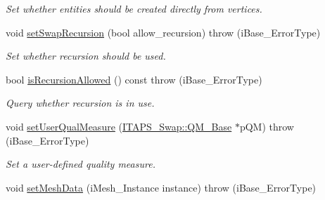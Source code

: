 \begin{DoxyCompactItemize}
\begin{DoxyCompactList}\small\item\em Set whether entities should be created directly from vertices. \item\end{DoxyCompactList}\item 
\hypertarget{class_i_t_a_p_s___swap_1_1_swap_a722719a31d50850b411b4e86f3b7fdfb}{
void \hyperlink{class_i_t_a_p_s___swap_1_1_swap_a722719a31d50850b411b4e86f3b7fdfb}{setSwapRecursion} (bool allow\_\-recursion)  throw (iBase\_\-ErrorType)}
\label{class_i_t_a_p_s___swap_1_1_swap_a722719a31d50850b411b4e86f3b7fdfb}

\begin{DoxyCompactList}\small\item\em Set whether recursion should be used. \item\end{DoxyCompactList}\item 
\hypertarget{class_i_t_a_p_s___swap_1_1_swap_a69252481d8dabc89dab04f3c746a729a}{
bool \hyperlink{class_i_t_a_p_s___swap_1_1_swap_a69252481d8dabc89dab04f3c746a729a}{isRecursionAllowed} () const   throw (iBase\_\-ErrorType)}
\label{class_i_t_a_p_s___swap_1_1_swap_a69252481d8dabc89dab04f3c746a729a}

\begin{DoxyCompactList}\small\item\em Query whether recursion is in use. \item\end{DoxyCompactList}\item 
\hypertarget{class_i_t_a_p_s___swap_1_1_swap_a6b19a2b25ce68389290223e5f732d077}{
void \hyperlink{class_i_t_a_p_s___swap_1_1_swap_a6b19a2b25ce68389290223e5f732d077}{setUserQualMeasure} (\hyperlink{class_i_t_a_p_s___swap_1_1_q_m___base}{ITAPS\_\-Swap::QM\_\-Base} $\ast$pQM)  throw (iBase\_\-ErrorType)}
\label{class_i_t_a_p_s___swap_1_1_swap_a6b19a2b25ce68389290223e5f732d077}

\begin{DoxyCompactList}\small\item\em Set a user-\/defined quality measure. \item\end{DoxyCompactList}\item 
\hypertarget{class_i_t_a_p_s___swap_1_1_swap_abc4575a381ce0162e8e7cbae7da5ccf4}{
void \hyperlink{class_i_t_a_p_s___swap_1_1_swap_abc4575a381ce0162e8e7cbae7da5ccf4}{setMeshData} (iMesh\_\-Instance instance)  throw (iBase\_\-ErrorType)}
\label{class_i_t_a_p_s___swap_1_1_swap_abc4575a381ce0162e8e7cbae7da5ccf4}


\end{DoxyCompactItemize}
